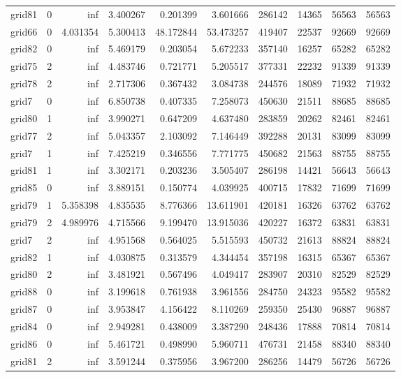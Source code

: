 \begin{longtable}{|l|r|r|r|r|r|r|r|r|r|}
grid81 & 0 & inf & 3.400267 & 0.201399 & 3.601666 & 286142 & 14365 & 56563 & 56563 \\
grid66 & 0 & 4.031354 & 5.300413 & 48.172844 & 53.473257 & 419407 & 22537 & 92669 & 92669 \\
grid82 & 0 & inf & 5.469179 & 0.203054 & 5.672233 & 357140 & 16257 & 65282 & 65282 \\
grid75 & 2 & inf & 4.483746 & 0.721771 & 5.205517 & 377331 & 22232 & 91339 & 91339 \\
grid78 & 2 & inf & 2.717306 & 0.367432 & 3.084738 & 244576 & 18089 & 71932 & 71932 \\
grid7 & 0 & inf & 6.850738 & 0.407335 & 7.258073 & 450630 & 21511 & 88685 & 88685 \\
grid80 & 1 & inf & 3.990271 & 0.647209 & 4.637480 & 283859 & 20262 & 82461 & 82461 \\
grid77 & 2 & inf & 5.043357 & 2.103092 & 7.146449 & 392288 & 20131 & 83099 & 83099 \\
grid7 & 1 & inf & 7.425219 & 0.346556 & 7.771775 & 450682 & 21563 & 88755 & 88755 \\
grid81 & 1 & inf & 3.302171 & 0.203236 & 3.505407 & 286198 & 14421 & 56643 & 56643 \\
grid85 & 0 & inf & 3.889151 & 0.150774 & 4.039925 & 400715 & 17832 & 71699 & 71699 \\
grid79 & 1 & 5.358398 & 4.835535 & 8.776366 & 13.611901 & 420181 & 16326 & 63762 & 63762 \\
grid79 & 2 & 4.989976 & 4.715566 & 9.199470 & 13.915036 & 420227 & 16372 & 63831 & 63831 \\
grid7 & 2 & inf & 4.951568 & 0.564025 & 5.515593 & 450732 & 21613 & 88824 & 88824 \\
grid82 & 1 & inf & 4.030875 & 0.313579 & 4.344454 & 357198 & 16315 & 65367 & 65367 \\
grid80 & 2 & inf & 3.481921 & 0.567496 & 4.049417 & 283907 & 20310 & 82529 & 82529 \\
grid88 & 0 & inf & 3.199618 & 0.761938 & 3.961556 & 284750 & 24323 & 95582 & 95582 \\
grid87 & 0 & inf & 3.953847 & 4.156422 & 8.110269 & 259350 & 25430 & 96887 & 96887 \\
grid84 & 0 & inf & 2.949281 & 0.438009 & 3.387290 & 248436 & 17888 & 70814 & 70814 \\
grid86 & 0 & inf & 5.461721 & 0.498990 & 5.960711 & 476731 & 21458 & 88340 & 88340 \\
grid81 & 2 & inf & 3.591244 & 0.375956 & 3.967200 & 286256 & 14479 & 56726 & 56726 \\

\end{longtable}
